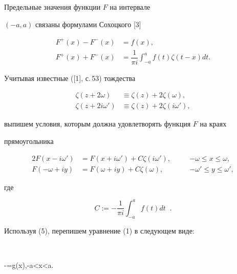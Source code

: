 Предельные значения функции $F$ на интервале


$(-a,a)$ связаны формулами Сохоцкого [3]


\begin{equation}


\begin{split}


F^{+}(x)-F^{-}(x)&=f(x),   \\


F^{+}(x)+F^{-}(x)&=\dfrac{1}{\pi i}\int^{a}_{-a}f(t)\zeta(t-x)dt.


\end{split}


\end{equation}


Учитывая известные ([1], с.\,53) тождества


\begin{align*}


\zeta(z+2\omega)&\equiv\zeta(z)+2\zeta(\omega), \\


\zeta(z+2i\omega')&\equiv\zeta(z)+2\zeta(i\omega'),


\end{align*}


выпишем условия, которым должна удовлетворять функция $F$ на краях


прямоугольника


\begin{alignat*}{2}


F(x-i\omega')&=F(x+i\omega')+C\zeta(i\omega'),&\quad


&-\omega\leqslant x\leqslant \omega, \\


F(-\omega+iy)&=F(\omega+iy)+C\zeta(\omega), &\quad


&-\omega'\leqslant y\leqslant \omega',


\end{alignat*}


где 


\begin{equation}


C:=-\dfrac{1}{\pi i}\int^{a}_{-a}f(t)dt\;\;.


\end{equation}


Используя (5), перепишем уравнение (1) в следующем виде:


$$


\lambda\left[F^{+}(x)-F^{-}(x)\right]


-\left[F^{+}(x)+F^{-}(x)\right]=g(x),\quad -a<x<a.


